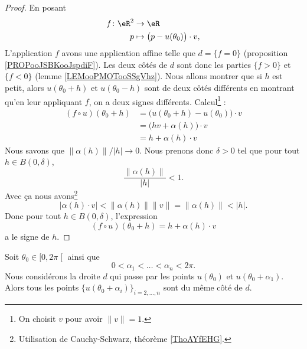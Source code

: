 \begin{proof}
	En posant
	\begin{equation}
		\begin{aligned}
			f\colon \eR^2 & \to \eR                                   \\
			p             & \mapsto \big( p-u(\theta_0) \big)\cdot v,
		\end{aligned}
	\end{equation}
	L'application \( f\) avons une application affine telle que \( d=\{ f=0 \}\) (proposition \ref{PROPooJSBKooJspdiF}). Les deux côtés de \( d\) sont donc les parties \( \{ f>0 \}\) et \( \{ f<0 \}\) (lemme \ref{LEMooPMOTooSSgVhz}). Nous allons montrer que si \( h\) est petit, alors \( u(\theta_0+h)\) et \( u(\theta_0-h)\) sont de deux côtés différents en montrant qu'en leur appliquant \( f\), on a deux signes différents. Calcul\footnote{On choisit \( v\) pour avoir \( \| v \|=1\).} :
	\begin{subequations}
		\begin{align}
			(f\circ u)(\theta_0+h) & =\big( u(\theta_0+h)-u(\theta_0) \big)\cdot v \\
			                       & =\big( hv+\alpha(h) \big)\cdot v              \\
			                       & =h+\alpha(h)\cdot v
		\end{align}
	\end{subequations}
	Nous savons que \( \| \alpha(h) \|/| h |\to 0\). Nous prenons donc \( \delta>0\) tel que pour tout \( h\in B(0,\delta)\),
	\begin{equation}
		\frac{ \| \alpha(h) \| }{ | h | }<1.
	\end{equation}
	Avec ça nous avons\footnote{Utilisation de Cauchy-Schwarz, théorème \ref{ThoAYfEHG}.}
	\begin{equation}
		| \alpha(h)\cdot v |<\| \alpha(h) \|\| v \|=\| \alpha(h) \|<| h |.
	\end{equation}
	Donc pour tout \( h\in B(0,\delta)\), l'expression
	\begin{equation}
		(f\circ u)(\theta_0+h)=h+\alpha(h)\cdot v
	\end{equation}
	a le signe de \( h\).
\end{proof}

\begin{lemma}	\label{LEMooEWPKooSwbBYZ}
	Soit \( \theta_0\in \mathopen[ 0,2\pi\mathclose[\) ainsi que
	\begin{equation}
		0<\alpha_1<\ldots<\alpha_n<2\pi.
	\end{equation}
	Nous considérons la droite \( d\) qui passe par les points \( u(\theta_0)\) et \( u(\theta_0+\alpha_1)\). Alors tous les points \( \{ u(\theta_0+\alpha_i) \}_{i=2,\ldots,n}\) sont du même côté de \( d\).
\end{lemma}

